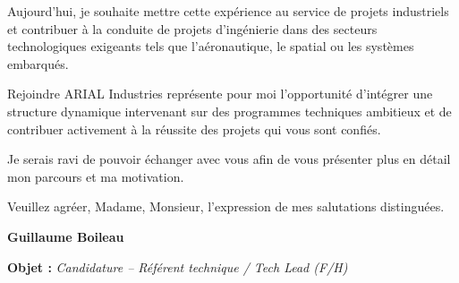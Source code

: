 \documentclass[11pt,a4paper]{altacv}
\begin{document}
{Aujourd’hui, je souhaite mettre cette expérience au service de projets industriels et contribuer à la conduite de projets d’ingénierie dans des secteurs technologiques exigeants tels que l’aéronautique, le spatial ou les systèmes embarqués.

Rejoindre ARIAL Industries représente pour moi l’opportunité d’intégrer une structure dynamique intervenant sur des programmes techniques ambitieux et de contribuer activement à la réussite des projets qui vous sont confiés.

Je serais ravi de pouvoir échanger avec vous afin de vous présenter plus en détail mon parcours et ma motivation.

Veuillez agréer, Madame, Monsieur, l’expression de mes salutations distinguées.

\textbf{Guillaume Boileau}

}
\fi
\vspace{-0.5cm}
\vspace{-.5cm}
{\color{accent}\textbf{Objet :}} \textit{Candidature -- Référent technique / Tech Lead (F/H)}
\end{document}
